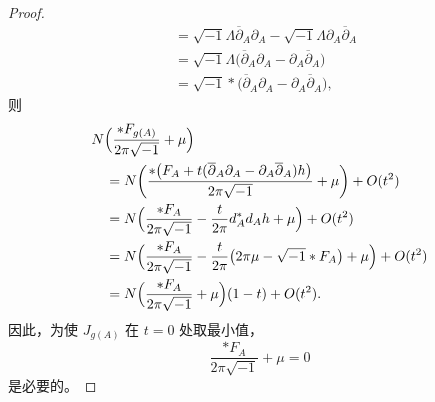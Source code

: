 \begin{proof}
\begin{align*}
    &=\sqrt{-1}\Lambda\overline{\partial}_A\partial_A-\sqrt{-1}\Lambda\partial_A\overline{\partial}_A\\
    &=\sqrt{-1}\Lambda\bigl(\overline{\partial}_A\partial_A-\partial_A\overline{\partial}_A\bigr)\\
    &=\sqrt{-1}\ast\bigl(\overline{\partial}_A\partial_A-\partial_A\overline{\partial}_A\bigr),
  \end{align*}
  则
  \begin{align*}
    &N\Bigl(\frac{\ast F_{g(A)}}{2\pi\sqrt{-1}}+\mu\Bigr)\\
    &\quad=N\biggl(\frac{\ast\bigl(F_A+t(\overline{\partial}_A\partial_A-\partial_A\overline{\partial}_A)h\bigr)}{2\pi\sqrt{-1}}+\mu\biggr)+O(t^2)\\
    &\quad=N\Bigl(\frac{\ast F_A}{2\pi\sqrt{-1}}-\frac t{2\pi}d_A^*d_Ah+\mu\Bigr)+O(t^2)\\
    &\quad=N\Bigl(\frac{\ast F_A}{2\pi\sqrt{-1}}-\frac t{2\pi}\bigl(2\pi\mu-\sqrt{-1}\ast F_A\bigr)+\mu\Bigr)+O(t^2)\\
    &\quad=N\Bigl(\frac{\ast F_A}{2\pi\sqrt{-1}}+\mu\Bigr)(1-t)+O(t^2).
  \end{align*}
  因此，为使 $J_{g(A)}$ 在 $t=0$ 处取最小值，
  \begin{equation}
    \frac{\ast F_A}{2\pi\sqrt{-1}}+\mu=0
    \tag{9.15.14}
  \end{equation}
  是必要的。
\end{proof}


